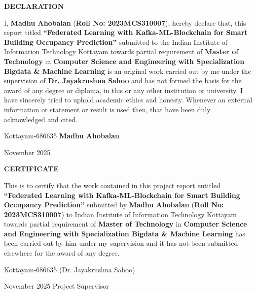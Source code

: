 \documentclass[12pt,a4wide]{report}
\theoremstyle{plain}
\theoremstyle{definition}
\theoremstyle{remark}
\begin{document}
\clearpage
 \setcounter{page}{2}
\begin{center}
{\large{\bf{DECLARATION}}}
\end{center}


\noindent I, \textbf{Madhu Ahobalan} (\textbf{Roll No: 2023MCS310007}), hereby declare that, this report titled
\textbf{``Federated Learning with Kafka-ML-Blockchain for Smart Building Occupancy Prediction''} submitted to the Indian Institute of Information Technology Kottayam towards partial requirement of {\bf Master of Technology} in \textbf{Computer Science and Engineering with Specialization Bigdata \& Machine Learning }
is an original work carried out by me under the supervision of \textbf{Dr. Jayakrushna Sahoo} and has not formed the basis for the award of any degree or diploma, in this or any other institution or
university. I have sincerely tried to uphold academic ethics and honesty. Whenever an external information or statement or result is used then, that have been duly acknowledged and cited.

\vspace{4cm}

\noindent Kottayam-686635 \hfill \textbf{Madhu Ahobalan}

\noindent November 2025

\clearpage


 \setcounter{page}{3}
\begin{center}
{\large{\bf{CERTIFICATE}}}
\end{center}


\noindent This is to certify that the work contained in this
project report entitled \textbf{``Federated Learning with Kafka-ML-Blockchain for Smart Building Occupancy Prediction''}
submitted by \textbf{Madhu Ahobalan} (\textbf{Roll No: 2023MCS310007}) to Indian Institute of Information Technology Kottayam
towards partial requirement of {\bf Master of Technology} in
\textbf{Computer Science and Engineering with Specialization Bigdata \& Machine Learning} has been carried out by him under my supervision and it has not been submitted elsewhere for the award of any degree.


\vspace{4cm}

\noindent Kottayam-686635  \hfill (Dr. Jayakrushna Sahoo)

\noindent November 2025 \hfill Project Supervisor
\end{document}
